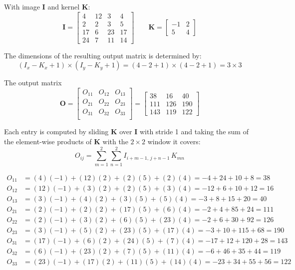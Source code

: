 \documentclass{cisXXX} %
\begin{document}
\maketitle
\HWproblem
With image $\mathbf{I}$ and kernel $\mathbf{K}$:
$$\mathbf{I} = \begin{bmatrix}
    4 & 12 & 3 & 4\\
    2 & 2 & 3 & 5 \\
    17 & 6 & 23 & 17 \\
    24 & 7 & 11 & 14
\end{bmatrix}
\qquad
\mathbf{K} = \begin{bmatrix}
    -1 & 2 \\
     5 & 4
\end{bmatrix}$$

The dimensions of the resulting output matrix is determined by:
$$ (I_x- K_x + 1) \times (I_y - K_y + 1) = (4-2+1)  \times (4-2+1) = 3 \times 3  $$

The output matrix $$\mathbf{O} = \begin{bmatrix}
    O_{11}&O_{12}&O_{13}\\
    O_{21}&O_{22}&O_{23}\\
    O_{31}&O_{32}&O_{33}\\
\end{bmatrix} = \begin{bmatrix}
    38 & 16 & 40 \\
    111 & 126 & 190 \\
    143 & 119 & 122
\end{bmatrix}$$

Each entry is computed by sliding $\mathbf{K}$ over $\mathbf{I}$ with stride 1 and taking the sum of the element-wise products of $\mathbf{K}$ with the $2 \times 2$ window it covers:
$$O_{ij} = \sum_{m=1}^{2}\sum_{n=1}^{2} I_{i+m-1,\, j+n-1}\, K_{mn}$$

\begin{align*}
O_{11} &= (4)(-1) + (12)(2) + (2)(5) + (2)(4) = -4 + 24 + 10 + 8 = 38 \\
O_{12} &= (12)(-1) + (3)(2) + (2)(5) + (3)(4) = -12 + 6 + 10 + 12 = 16 \\
O_{13} &= (3)(-1) + (4)(2) + (3)(5) + (5)(4) = -3 + 8 + 15 + 20 = 40 \\
O_{21} &= (2)(-1) + (2)(2) + (17)(5) + (6)(4) = -2 + 4 + 85 + 24 = 111 \\
O_{22} &= (2)(-1) + (3)(2) + (6)(5) + (23)(4) = -2 + 6 + 30 + 92 = 126 \\
O_{23} &= (3)(-1) + (5)(2) + (23)(5) + (17)(4) = -3 + 10 + 115 + 68 = 190 \\
O_{31} &= (17)(-1) + (6)(2) + (24)(5) + (7)(4) = -17 + 12 + 120 + 28 = 143 \\
O_{32} &= (6)(-1) + (23)(2) + (7)(5) + (11)(4) = -6 + 46 + 35 + 44 = 119 \\
O_{33} &= (23)(-1) + (17)(2) + (11)(5) + (14)(4) = -23 + 34 + 55 + 56 = 122
\end{align*}
\end{document}
